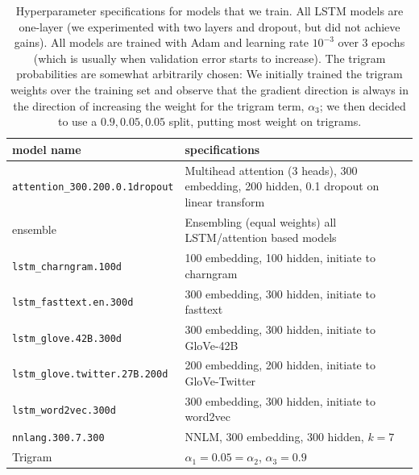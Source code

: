 \documentclass[12pt]{article}
\begin{document}
\begin{landscape}
\begin{table}[tb]
    
    \centering
\begin{tabular}{ll}
\toprule
model name                   &specifications\\
\midrule
\texttt{attention\_300.200.0.1dropout} & Multihead attention (3 heads), 300 embedding, 200 hidden, 0.1 dropout on linear transform\\
ensemble                     & Ensembling (equal weights) all LSTM/attention based models\\
\texttt{lstm\_charngram.100d }         & 100 embedding, 100 hidden, initiate to charngram \\
\texttt{lstm\_fasttext.en.300d }       & 300 embedding, 300 hidden, initiate to fasttext \\
\texttt{lstm\_glove.42B.300d    }      & 300 embedding, 300 hidden, initiate to GloVe-42B \\
\texttt{lstm\_glove.twitter.27B.200d}  & 200 embedding, 200 hidden, initiate to GloVe-Twitter \\
\texttt{lstm\_word2vec.300d         }  & 300 embedding, 300 hidden, initiate to word2vec \\
\texttt{nnlang.300.7.300            } & NNLM, 300 embedding, 300 hidden, $k=7$\\
Trigram & $\alpha_1 = 0.05 = \alpha_2$, $\alpha_3 = 0.9$\\
\bottomrule
\end{tabular}
    \caption{Hyperparameter specifications for models that we train. All LSTM
    models are one-layer (we experimented with two layers and dropout, but did
    not achieve gains). All models are trained with Adam and learning rate
    $10^{-3}$ over 3 epochs (which is usually when validation error starts to
    increase). The trigram probabilities are somewhat arbitrarily chosen: We
    initially trained the trigram weights over the training set and observe
    that the gradient direction is always in the direction of increasing the
    weight for the trigram term, $\alpha_3$; we then decided to use a $0.9,
    0.05,0.05$ split, putting most weight on trigrams.}
    \label{tab:spec}
\end{table}
\end{landscape}
\end{document}
